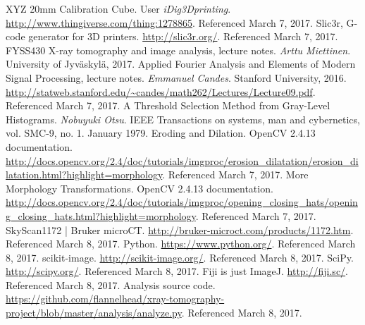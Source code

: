 \documentclass[a4paper,twoside,12pt]{article}
\begin{document}
\clearpage

\begin{thebibliography}{9}
     XYZ 20mm Calibration Cube. User \emph{iDig3Dprinting}. \url{http://www.thingiverse.com/thing:1278865}. Referenced March 7, 2017.
     Slic3r, G-code generator for 3D printers. \url{http://slic3r.org/}. Referenced March 7, 2017.
     FYSS430 X-ray tomography and image analysis, lecture notes. \emph{Arttu Miettinen}. University of Jyväskylä, 2017.
     Applied Fourier Analysis and Elements of Modern Signal Processing, lecture notes. \emph{Emmanuel Candes}. Stanford University, 2016. \url{http://statweb.stanford.edu/~candes/math262/Lectures/Lecture09.pdf}. Referenced March 7, 2017.
     A Threshold Selection Method from Gray-Level Histograms. \emph{Nobuyuki Otsu}. IEEE Transactions on systems, man and cybernetics, vol. SMC-9, no. 1. January 1979.
     Eroding and Dilation. OpenCV 2.4.13 documentation. \url{http://docs.opencv.org/2.4/doc/tutorials/imgproc/erosion_dilatation/erosion_dilatation.html?highlight=morphology}. Referenced March 7, 2017.
     More Morphology Transformations. OpenCV 2.4.13 documentation. \url{http://docs.opencv.org/2.4/doc/tutorials/imgproc/opening_closing_hats/opening_closing_hats.html?highlight=morphology}. Referenced March 7, 2017.
     SkyScan1172 | Bruker microCT. \url{http://bruker-microct.com/products/1172.htm}. Referenced March 8, 2017.
     Python. \url{https://www.python.org/}. Referenced March 8, 2017.
     scikit-image. \url{http://scikit-image.org/}. Referenced March 8, 2017.
     SciPy. \url{http://scipy.org/}. Referenced March 8, 2017.
     Fiji is just ImageJ. \url{http://fiji.sc/}. Referenced March 8, 2017.
     Analysis source code. \url{https://github.com/flannelhead/xray-tomography-project/blob/master/analysis/analyze.py}. Referenced March 8, 2017.
\end{thebibliography}
\end{document}
